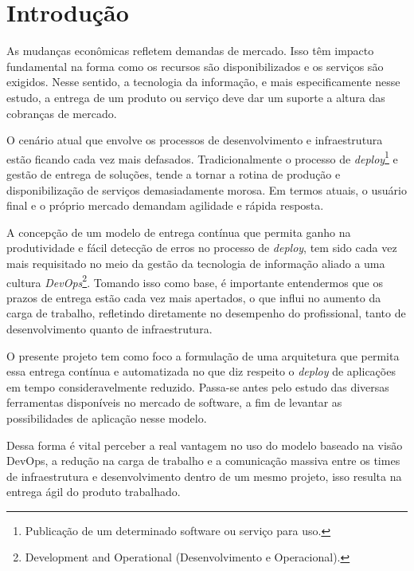 

\chapter{Introdução}\label{intro}

As mudanças econômicas refletem demandas de mercado. Isso têm impacto fundamental na forma como os recursos são disponibilizados e os serviços são exigidos. Nesse sentido, a tecnologia da informação, e mais especificamente nesse estudo, a entrega de um produto ou serviço deve dar um suporte a altura das cobranças de mercado.

O cenário atual que envolve os processos de desenvolvimento e infraestrutura estão ficando cada vez mais defasados. Tradicionalmente o processo de \textit{deploy}\footnote{Publicação de um determinado software ou serviço para uso.} e gestão de entrega de soluções, tende a tornar a rotina de produção e disponibilização de serviços demasiadamente morosa. Em termos atuais, o usuário final e o próprio mercado demandam agilidade e rápida resposta.

A concepção de um modelo de entrega contínua que permita ganho na produtividade e fácil detecção de erros no processo de \textit{deploy}, tem sido cada vez mais requisitado no meio da gestão da tecnologia de informação aliado a uma cultura \textit{DevOps}\footnote{Development and Operational (Desenvolvimento e Operacional).}. Tomando isso como base, é importante entendermos que os prazos de entrega estão cada vez mais apertados, o que influi no aumento da carga de trabalho, refletindo diretamente no desempenho do profissional, tanto de desenvolvimento quanto de infraestrutura.

O presente projeto tem como foco a formulação de uma arquitetura que permita essa entrega contínua e automatizada no que diz respeito o \textit{deploy} de aplicações em tempo consideravelmente reduzido. Passa-se antes pelo estudo das diversas ferramentas disponíveis no mercado de software, a fim de levantar as possibilidades de aplicação nesse modelo.

Dessa forma é vital perceber a real vantagem no uso do modelo baseado na visão DevOps, a redução na carga de trabalho e a comunicação massiva entre os times de infraestrutura e desenvolvimento dentro de um mesmo projeto, isso resulta na entrega ágil do produto trabalhado.

